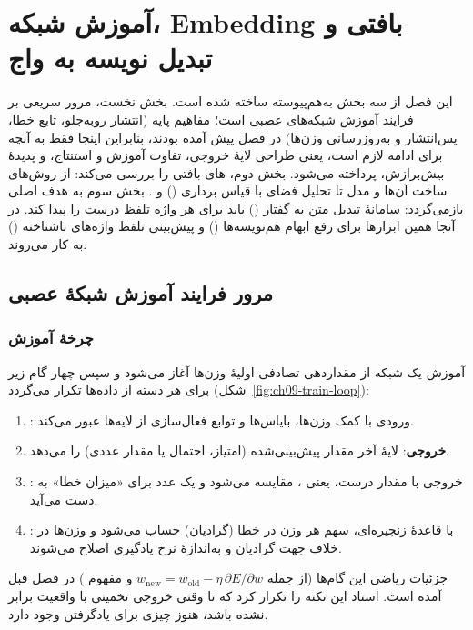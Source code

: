 \chapter{آموزش شبکه، Embedding بافتی و تبدیل نویسه به واج}

این فصل از سه بخش به‌هم‌پیوسته ساخته شده است. بخش نخست، مرور سریعی بر فرایند آموزش شبکه‌های عصبی است؛ مفاهیم پایه (انتشار رو‌به‌جلو، تابع خطا، پس‌انتشار و به‌روزرسانی وزن‌ها) در فصل پیش آمده بودند، بنابراین اینجا فقط به آنچه برای ادامه لازم است، یعنی طراحی لایهٔ خروجی، تفاوت آموزش و استنتاج، و پدیدهٔ بیش‌برازش، پرداخته می‌شود. بخش دوم، های بافتی را بررسی می‌کند: از روش‌های ساخت آن‌ها و مدل  تا تحلیل فضای  با قیاس برداری () و . بخش سوم به هدف اصلی بازمی‌گردد: سامانهٔ تبدیل متن به گفتار () باید برای هر واژه تلفظ درست را پیدا کند. در آنجا همین ابزارها برای رفع ابهام هم‌نویسه‌ها () و پیش‌بینی تلفظ واژه‌های ناشناخته () به کار می‌روند.

\section{مرور فرایند آموزش شبکهٔ عصبی}

\subsection{چرخهٔ آموزش}
آموزش یک شبکه از مقداردهی تصادفی اولیهٔ وزن‌ها آغاز می‌شود و سپس چهار گام زیر برای هر دسته از داده‌ها تکرار می‌گردد (شکل~\ref{fig:ch09-train-loop}):
\begin{enumerate}
  \item {}: ورودی با کمک وزن‌ها، بایاس‌ها و توابع فعال‌سازی از لایه‌ها عبور می‌کند.
  \item \textbf{خروجی}: لایهٔ آخر مقدار پیش‌بینی‌شده (امتیاز، احتمال یا مقدار عددی) را می‌دهد.
  \item {}: خروجی با مقدار درست، یعنی ، مقایسه می‌شود و یک عدد برای «میزان خطا» به دست می‌آید.
  \item {}: با قاعدهٔ زنجیره‌ای، سهم هر وزن در خطا (گرادیان) حساب می‌شود و وزن‌ها در خلاف جهت گرادیان و به‌اندازهٔ نرخ یادگیری اصلاح می‌شوند.
\end{enumerate}
جزئیات ریاضی این گام‌ها (از جمله \mbox{$w_{\text{new}}=w_{\text{old}}-\eta\,\partial E/\partial w$} و مفهوم ) در فصل قبل آمده است. استاد این نکته را تکرار کرد که تا وقتی خروجی تخمینی با واقعیت برابر نشده باشد، هنوز چیزی برای یادگرفتن وجود دارد.

